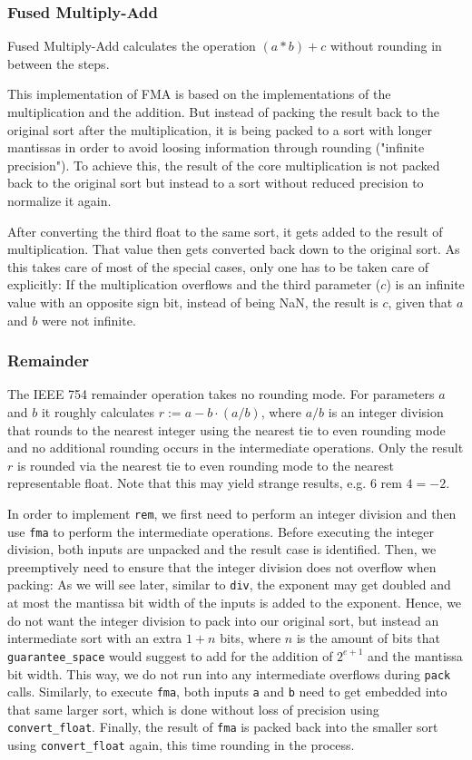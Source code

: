 \documentclass[a4paper,UKenglish,cleveref, autoref, thm-restate]{lipics-v2019}
\begin{document}
\subsubsection{Fused Multiply-Add}
Fused Multiply-Add calculates the operation $(a * b) + c$ without rounding in between the steps.

This implementation of FMA is based on the implementations of the multiplication and the addition. 
But instead of packing the result back to the original sort after the multiplication, it is being packed to a sort with longer mantissas in order to avoid loosing information through rounding ("infinite precision"). To achieve this, the result of the core multiplication is not packed back to the original sort but instead to a sort without reduced precision to normalize it again.

After converting the third float to the same sort, it gets added to the result of multiplication. That value then gets converted back down to the original sort. As this takes care of most of the special cases, only one has to be taken care of explicitly:
If the multiplication overflows and the third parameter ($c$) is an infinite value with an opposite sign bit, instead of being NaN, the result is $c$, given that $a$ and $b$ were not infinite.


\subsubsection{Remainder}
\label{rem}
The IEEE 754 remainder operation takes no rounding mode. For parameters $a$ and $b$ it roughly calculates $r := a - b \cdot (a / b)$, where $a / b$ is an integer division that rounds to the nearest integer using the nearest tie to even rounding mode and no additional rounding occurs in the intermediate operations. Only the result $r$ is rounded via the nearest tie to even rounding mode to the nearest representable float. Note that this may yield strange results, e.g. $6 \text{ rem } 4 = -2$.

In order to implement \verb|rem|, we first need to perform an integer division and then use \verb|fma| to perform the intermediate operations. Before executing the integer division, both inputs are unpacked and the result case is identified. Then, we preemptively need to ensure that the integer division does not overflow when packing: As we will see later, similar to \verb|div|, the exponent may get doubled and at most the mantissa bit width of the inputs is added to the exponent. Hence, we do not want the integer division to pack into our original sort, but instead an intermediate sort with an extra $1 + n$ bits, where $n$ is the amount of bits that \verb|guarantee_space| would suggest to add for the addition of $2^{e+1}$ and the mantissa bit width. This way, we do not run into any intermediate overflows during \verb|pack| calls. Similarly, to execute \verb|fma|, both inputs \verb|a| and \verb|b| need to get embedded into that same larger sort, which is done without loss of precision using \verb|convert_float|. Finally, the result of \verb|fma| is packed back into the smaller sort using \verb|convert_float| again, this time rounding in the process.
\end{document}
